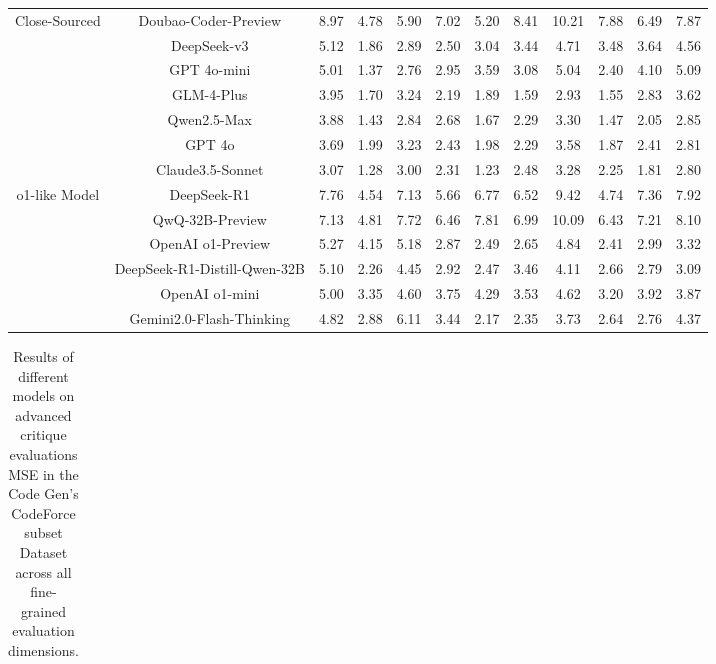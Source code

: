 \documentclass[11pt, a4paper, logo, copyright, nonumbering, amsart]{map}
\begin{document}
\begin{CJK*}{UTF8}{gbsn}
\begin{table*}[h!]
\begin{adjustbox}{width=\textwidth}
\begin{tabular}{c|c|cccccccccc}
    \midrule
    \multirow{7}{*}{Close-Sourced} 
    & Doubao-Coder-Preview & 8.97 & 4.78 & 5.90 & 7.02 & 5.20 & 8.41 & 10.21 & 7.88 & 6.49 & 7.87 \\
    & DeepSeek-v3 & 5.12 & 1.86 & 2.89 & 2.50 & 3.04 & 3.44 & 4.71 & 3.48 & 3.64 & 4.56 \\
    & GPT 4o-mini & 5.01 & 1.37 & 2.76 & 2.95 & 3.59 & 3.08 & 5.04 & 2.40 & 4.10 & 5.09 \\
    & GLM-4-Plus & 3.95 & 1.70 & 3.24 & 2.19 & 1.89 & 1.59 & 2.93 & 1.55 & 2.83 & 3.62 \\
    & Qwen2.5-Max & 3.88 & 1.43 & 2.84 & 2.68 & 1.67 & 2.29 & 3.30 & 1.47 & 2.05 & 2.85 \\
    & GPT 4o & 3.69 & 1.99 & 3.23 & 2.43 & 1.98 & 2.29 & 3.58 & 1.87 & 2.41 & 2.81 \\
    & Claude3.5-Sonnet & 3.07 & 1.28 & 3.00 & 2.31 & 1.23 & 2.48 & 3.28 & 2.25 & 1.81 & 2.80 \\
    
    \midrule
    \multirow{6}{*}{o1-like Model} 
    & DeepSeek-R1 & 7.76 & 4.54 & 7.13 & 5.66 & 6.77 & 6.52 & 9.42 & 4.74 & 7.36 & 7.92 \\
    & QwQ-32B-Preview & 7.13 & 4.81 & 7.72 & 6.46 & 7.81 & 6.99 & 10.09 & 6.43 & 7.21 & 8.10 \\
    & OpenAI o1-Preview & 5.27 & 4.15 & 5.18 & 2.87 & 2.49 & 2.65 & 4.84 & 2.41 & 2.99 & 3.32 \\
    & DeepSeek-R1-Distill-Qwen-32B & 5.10 & 2.26 & 4.45 & 2.92 & 2.47 & 3.46 & 4.11 & 2.66 & 2.79 & 3.09 \\
    & OpenAI o1-mini & 5.00 & 3.35 & 4.60 & 3.75 & 4.29 & 3.53 & 4.62 & 3.20 & 3.92 & 3.87 \\
    & Gemini2.0-Flash-Thinking & 4.82 & 2.88 & 6.11 & 3.44 & 2.17 & 2.35 & 3.73 & 2.64 & 2.76 & 4.37 \\
    \bottomrule
    \end{tabular}
    \end{adjustbox}
\end{table*}

\begin{table*}[h!]
    \centering
    \caption{Results of different models on advanced critique evaluations MSE in the Code Gen's CodeForce subset Dataset across all fine-grained evaluation dimensions.} \label{table:algo_level2_codeforce_dim}
    \begin{adjustbox}{width=\textwidth}
    \begin{tabular}{c|c|cccccccccc}
    

\end{tabular}
\end{adjustbox}
\end{table*}
\end{CJK*}
\end{document}

